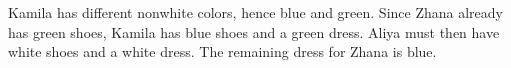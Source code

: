 Kamila has different nonwhite colors, hence blue and green. Since Zhana already has green shoes, Kamila has blue shoes and a green dress. Aliya must then have white shoes and a white dress. The remaining dress for Zhana is $\boxed{\text{blue}}$.
